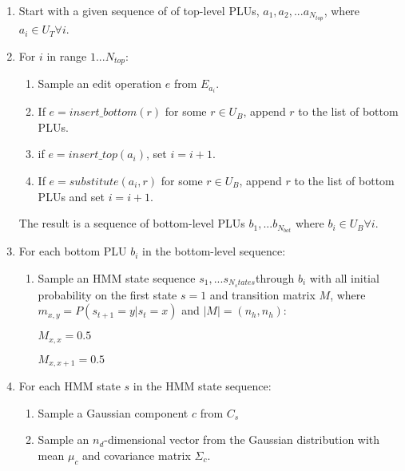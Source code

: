\documentclass[11pt]{article}
\newcommand{\myindent}{\hspace{2cm}}
\begin{document}
\begin{enumerate}

\item Start with a given sequence of of top-level PLUs,
  $a_1, a_2, ... a_{N_{top}}$, where $a_i \in U_T \forall i$.

\item For $i$ in range $1...N_{top}$:
\begin{enumerate}
\item Sample an edit operation $e$ from $E_{a_i}$.
\item If $e = insert\_bottom(r)$ for some $r \in U_B$, append $r$ to
  the list of bottom PLUs.
\item if $e = insert\_top(a_i)$, set $i=i+1$.
\item If $e = substitute(a_i,r)$ for some $r \in U_B$, append $r$ to
  the list of bottom PLUs and set $i=i+1$.
\end{enumerate}

The result is a sequence of bottom-level PLUs $b_1,...b_{N_{bot}}$
where $b_i \in U_B \forall i$.

\item For each bottom PLU $b_i$ in the bottom-level sequence:
\begin{enumerate}
\item Sample an HMM state sequence $s_1,...s_{N_states}$through $b_i$
  with all initial probability on the first state $s=1$ and transition
  matrix $M$, where $m_{x,y}=P(s_{t+1}=y|s_t=x)$ and $|M|=(n_h,n_h)$:

\myindent $M_{x,x}=0.5$

\myindent $M_{x,x+1}=0.5$

\end{enumerate}

\item For each HMM state $s$ in the HMM state sequence:
\begin{enumerate}
\item Sample a Gaussian component $c$ from $C_s$

\item Sample an $n_d$-dimensional vector from the Gaussian
  distribution with mean $\mu_c$ and covariance matrix $\Sigma_c$.

\end{enumerate}

\end{enumerate}
\end{document}
